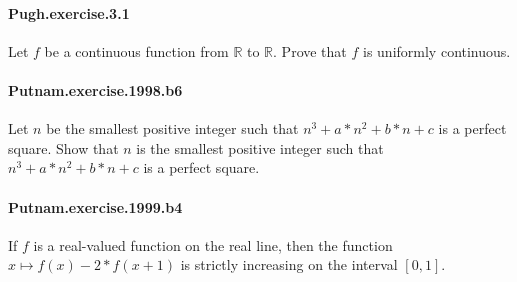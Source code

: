 \documentclass{article}
\begin{document}


\paragraph{Pugh.exercise.3.1} Let $f$ be a continuous function from $\mathbb{R}$ to $\mathbb{R}$. Prove that $f$ is uniformly continuous.



\paragraph{Putnam.exercise.1998.b6} Let $n$ be the smallest positive integer such that $n^3 + a*n^2 + b*n + c$ is a perfect square. Show that $n$ is the smallest positive integer such that $n^3 + a*n^2 + b*n + c$ is a perfect square.

\paragraph{Putnam.exercise.1999.b4} If $f$ is a real-valued function on the real line, then the function $x \mapsto f(x) - 2 * f(x + 1)$ is strictly increasing on the interval $[0, 1]$.
\end{document}
